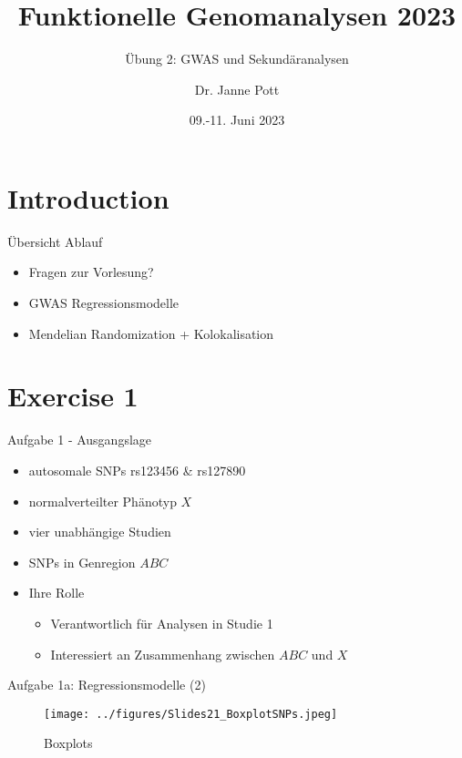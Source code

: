 \documentclass{beamer}
\title{Funktionelle Genomanalysen 2023}
\subtitle{Übung 2: GWAS und Sekundäranalysen}
\author{Dr. Janne Pott}
\date{09.-11. Juni 2023}
\begin{document}
\begin{frame}
\titlepage
\end{frame}

\section{Introduction}

\begin{frame}{Übersicht Ablauf}
\begin{itemize}
    \item Fragen zur Vorlesung?
    \item GWAS Regressionsmodelle
    \item Mendelian Randomization + Kolokalisation 
\end{itemize}
\end{frame}

\section{Exercise 1}

\begin{frame}{Aufgabe 1 - Ausgangslage}
\begin{itemize}
    \item autosomale SNPs rs123456 \& rs127890
    \item normalverteilter Phänotyp $X$
    \item vier unabhängige Studien
    \item SNPs in Genregion $ABC$
    \item Ihre Rolle
    \begin{itemize}
        \item Verantwortlich für Analysen in Studie 1
        \item Interessiert an Zusammenhang zwischen $ABC$ und $X$
    \end{itemize}
\end{itemize} 
\end{frame}

\begin{frame}{Aufgabe 1a: Regressionsmodelle (2)}
\begin{figure}[h]
\begin{center}
\texttt{[image: ../figures/Slides21\_BoxplotSNPs.jpeg]}
\caption{Boxplots}
\label{fig:Boxplots}
\end{center}
\end{figure}
\end{frame}
\end{document}

